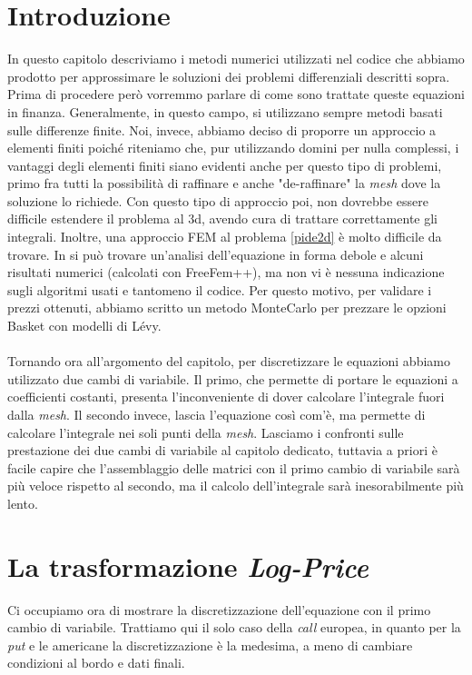\documentclass[a4paper,10pt]{report}
\theoremstyle{plain}
\theoremstyle{definition}
\theoremstyle{remark}
\begin{document}
\section{Introduzione}
In questo capitolo descriviamo i metodi numerici utilizzati nel codice che abbiamo prodotto per approssimare le soluzioni dei problemi differenziali descritti sopra. Prima di procedere per\`o vorremmo parlare di come sono trattate queste equazioni in finanza. Generalmente, in questo campo, si utilizzano sempre metodi basati sulle differenze finite. Noi, invece, abbiamo deciso di proporre un approccio a elementi finiti poich\'e riteniamo che, pur utilizzando domini per nulla complessi, i vantaggi degli elementi finiti siano evidenti anche per questo tipo di problemi, primo fra tutti la possibilit\`a di raffinare e anche "de-raffinare" la \emph{mesh} dove la soluzione lo richiede. Con questo tipo di approccio poi, non dovrebbe essere difficile estendere il problema al 3d, avendo cura di trattare correttamente gli integrali. Inoltre, una approccio FEM al problema \ref{pide2d} è molto difficile da trovare. In \cite{jinghui2009multi} si può trovare un'analisi dell'equazione in forma debole e alcuni risultati numerici (calcolati con \textsf{FreeFem++}), ma non vi è nessuna indicazione sugli algoritmi usati e tantomeno il codice. Per questo motivo, per validare i prezzi ottenuti, abbiamo scritto un metodo MonteCarlo per prezzare le opzioni Basket con modelli di L\'evy.\\\\Tornando ora all'argomento del capitolo, per discretizzare le equazioni abbiamo utilizzato due cambi di variabile. Il primo, che permette di portare le equazioni a coefficienti costanti, presenta l'inconveniente di dover calcolare l'integrale fuori dalla \emph{mesh}. Il secondo invece, lascia l'equazione cos\`i com'\`e, ma permette di calcolare l'integrale nei soli punti della \emph{mesh}. Lasciamo i confronti sulle prestazione dei due cambi di variabile al capitolo dedicato, tuttavia a priori \`e facile capire che l'assemblaggio delle matrici con il primo cambio di variabile sar\`a pi\`u veloce rispetto al secondo, ma il calcolo dell'integrale sar\`a inesorabilmente pi\`u lento.

\section{La trasformazione \emph{Log-Price}}
Ci occupiamo ora di mostrare la discretizzazione dell'equazione con il primo cambio di variabile. Trattiamo qui il solo caso della \emph{call} europea, in quanto per la \emph{put} e le americane la discretizzazione \`e la medesima, a meno di cambiare condizioni al bordo e dati finali.
\end{document}
